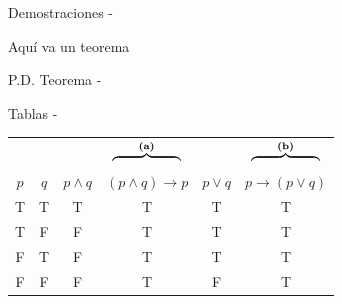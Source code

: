 \documentclass[11pt,letterpaper]{article}
\begin{document}
\begin{intro}
    \lipsum[2]
\end{intro}


\begin{inciso}{Demostraciones}
- \lipsum[4] 

\begin{teorema}
Aquí va un teorema
\end{teorema}

\begin{demostracion}{P.D. Teorema }
- \lipsum[4] 
\end{demostracion}
\end{inciso}


\begin{inciso}{Tablas}
-    \lipsum[4]


\begin{table}[H]
    \centering
    \begin{tabular}{c*{5}{|c}}
    &
    &&
    \\[-1ex]
    $p$ & $q$ & $p\land q$ & $(p\land q)\to p$ & $p\lor q$ & $p\to (p\lor q)$\\
    \hline
    T & T & T & T & T & T\\
    T & F & F & T & T & T\\
    F & T & F & T & T & T\\
    F & F & F & T & F & T
    \end{tabular}
    \label{tab:logica}
    \end{table}

\end{inciso}
\end{document}
